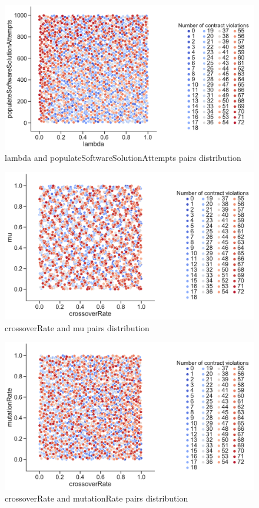 \begin{figure}
	\centering
	\includegraphics[width=\textwidth]{images/PairsDistr/lambda_populateSoftwareSolutionAttempts.pdf}
	\caption[lambda and populateSoftwareSolutionAttempts pairs distribution]{lambda and populateSoftwareSolutionAttempts pairs distribution}
	\label{fig:lambda_populateSoftwareSolutionAttempts_pair}
\end{figure}
\clearpage
\begin{figure}
	\centering
	\includegraphics[width=\textwidth]{images/PairsDistr/crossoverRate_mu.pdf}
	\caption[crossoverRate and mu pairs distribution]{crossoverRate and mu pairs distribution}
	\label{fig:crossoverRate_mu_pair}
\end{figure}
\clearpage
\begin{figure}
	\centering
	\includegraphics[width=\textwidth]{images/PairsDistr/crossoverRate_mutationRate.pdf}
	\caption[crossoverRate and mutationRate pairs distribution]{crossoverRate and mutationRate pairs distribution}
	\label{fig:crossoverRate_mutationRate_pair}
\end{figure}

